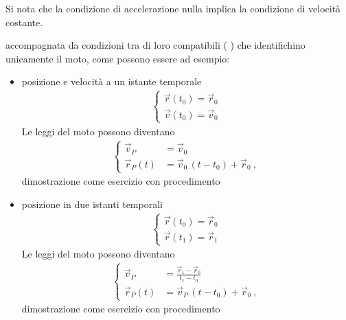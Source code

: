 \documentclass[letterpaper,10pt,italian]{jupyterBook}
\begin{document}
\sphinxAtStartPar
Si nota che la condizione di accelerazione nulla implica la condizione di velocità costante. 

\sphinxAtStartPar
accompagnata da condizioni tra di loro compatibili ( ) che identifichino unicamente il moto, come possono essere ad esempio:
\begin{itemize}
\item {} 
\sphinxAtStartPar
posizione e velocità a un istante temporale
\begin{equation*}
\begin{split}\begin{cases}
    \vec{r}(t_0) = \vec{r}_0 \\
    \vec{v}(t_0) = \vec{v}_0
  \end{cases}\end{split}
\end{equation*}
\sphinxAtStartPar
Le leggi del moto possono diventano
\begin{equation*}
\begin{split}\begin{cases}
    \vec{v}_P    & = \vec{v}_0  \\
    \vec{r}_P(t) & = \vec{v}_0 \, ( t - t_0 ) + \vec{r}_0 \ ,
  \end{cases}\end{split}
\end{equation*}
\sphinxAtStartPar
{} dimostrazione come esercizio con procedimento

\item {} 
\sphinxAtStartPar
posizione in due istanti temporali
\begin{equation*}
\begin{split}\begin{cases}
    \vec{r}(t_0) = \vec{r}_0 \\
    \vec{r}(t_1) = \vec{r}_1
  \end{cases}\end{split}
\end{equation*}
\sphinxAtStartPar
Le leggi del moto possono diventano
\begin{equation*}
\begin{split}\begin{cases}
    \vec{v}_P    & = \frac{\vec{r}_1 - \vec{r}_0}{t_1 - t_0} \\
    \vec{r}_P(t) & = \vec{v}_P \, ( t - t_0 ) + \vec{r}_0 \ ,
  \end{cases}\end{split}
\end{equation*}
\sphinxAtStartPar
{} dimostrazione come esercizio con procedimento

\end{itemize}
\end{document}
